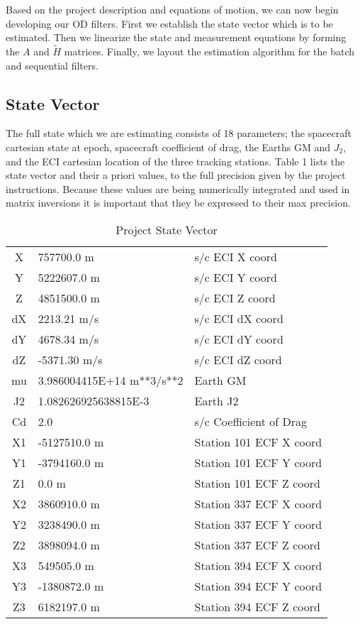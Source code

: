 \documentclass[10pt]{article}
\begin{document}
Based on the project description and equations of motion, we can now begin developing our OD filters. First we establish the state vector which is to be estimated. Then we linearize the state and measurement equations by forming the $A$ and $\tilde{H}$ matrices. Finally, we layout the estimation algorithm for the batch and sequential filters. 

\subsection{State Vector}

The full state which we are estimating consists of 18 parameters; the spacecraft cartesian state at epoch, spacecraft coefficient of drag, the Earths GM and $J_2$, and the ECI cartesian location of the three tracking stations. Table 1 lists the state vector and their a priori values, to the full precision given by the project instructions. Because these values are being numerically integrated and used in matrix inversions it is important that they be expressed to their max precision.

\begin{table}[htdp]
\caption{Project State Vector}
\begin{center}
\begin{tabular}{|c|l|l|}
\hline\hline
X & 757700.0 m & s/c ECI X coord \\
Y & 5222607.0 m & s/c ECI Y coord \\
Z & 4851500.0 m & s/c ECI Z coord \\
dX & 2213.21 m/s & s/c ECI dX coord \\
dY & 4678.34 m/s & s/c ECI dY coord \\
dZ & -5371.30 m/s & s/c ECI dZ coord \\
mu & 3.986004415E+14 m**3/s**2 & Earth GM \\
J2 & 1.082626925638815E-3 & Earth J2 \\
Cd & 2.0 & s/c Coefficient of Drag \\
X1 & -5127510.0 m & Station 101 ECF X coord \\
Y1 & -3794160.0 m & Station 101 ECF Y coord \\
Z1 & 0.0 m & Station 101 ECF Z coord \\
X2 & 3860910.0 m & Station 337 ECF X coord \\
Y2 & 3238490.0 m & Station 337 ECF Y coord \\
Z2 & 3898094.0 m & Station 337 ECF Z coord \\
X3 & 549505.0  m & Station 394 ECF X coord \\
Y3 & -1380872.0 m & Station 394 ECF Y coord \\
Z3 & 6182197.0 m & Station 394 ECF Z coord \\
\hline\hline
\end{tabular}
\end{center}
\label{default}
\end{table}%
\end{document}
